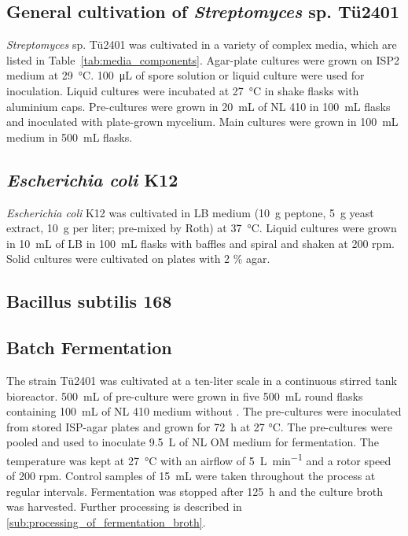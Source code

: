 	\subsection{General cultivation of \emph{Streptomyces} sp. T\"u2401} %
	\label{sub:streptomyces_sp_t}
		\emph{Streptomyces} sp. T\"u2401 was cultivated in a variety of complex media, which are listed in Table~\ref{tab:media_components}. Agar-plate cultures were grown on ISP2 medium at \SI{29}{\celsius}. \SI{100}{\micro\liter} of spore solution or liquid culture were used for inoculation. Liquid cultures were incubated at \SI{27}{\celsius} in shake flasks with aluminium caps. Pre-cultures were grown in \SI{20}{\milli\liter} of NL 410 in \SI{100}{\milli\liter} flasks and inoculated with plate-grown mycelium. Main cultures were grown in \SI{100}{\milli\liter} medium in \SI{500}{\milli\liter} flasks.

	\subsection{\emph{Escherichia coli} K12} %
	\label{sub:escherichia_coli_k12}
		\emph{Escherichia coli} K12 was cultivated in LB medium (\SI{10}{\gram} peptone, \SI{5}{\gram} yeast extract, \SI{10}{\gram}  per liter; pre-mixed by Roth) at \SI{37}{\celsius}. Liquid cultures were grown in \SI{10}{\milli\liter} of LB in \SI{100}{\milli\liter} flasks with baffles and spiral and shaken at 200 rpm. Solid cultures were cultivated on plates with 2 \% agar.	

	\subsection{Bacillus subtilis 168} %
	\label{sub:bacillus_subtilis_116}
	

	\subsection{Batch Fermentation} %
	\label{sub:fermentation}
	The strain T\"u2401 was cultivated at a ten-liter scale in a continuous stirred tank bioreactor. \SI{500}{\milli\liter} of pre-culture were grown in five \SI{500}{\milli\liter} round flasks containing \SI{100}{\milli\liter} of NL 410 medium without . The pre-cultures were inoculated from stored ISP-agar plates and grown for \SI{72}{\hour} at 27 \si{\celsius}. The pre-cultures were pooled and used to inoculate \SI{9.5}{\liter} of NL OM medium for fermentation. The temperature was kept at \SI{27}{\celsius} with an airflow of \SI{5}{\liter\per\minute} and a rotor speed of 200 rpm. Control samples of \SI{15}{\milli\liter} were taken throughout the process at regular intervals. Fermentation was stopped after \SI{125}{\hour} and the culture broth was harvested. Further processing is described in \ref{sub:processing_of_fermentation_broth}.
	
